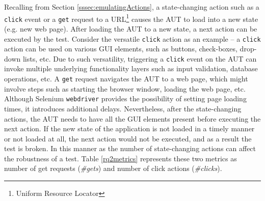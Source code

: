 Recalling from Section \ref{sssec:emulatingActions}, a state-changing action such as a \texttt{click} event or a \texttt{get} request to a URL\footnote{Uniform Resource Locator} causes the AUT to load into a new state (e.g. new web page). After loading the AUT to a new state, a next action can be executed by the test. Consider the versatile \texttt{click} action as an example -- a \texttt{click} action can be used on various GUI elements, such as buttons, check-boxes, drop-down lists, etc. Due to such versatility, triggering a \texttt{click} event on the AUT can invoke multiple underlying functionality layers such as input validation, database operations, etc. A \texttt{get} request navigates the AUT to a web page, which might involve steps such as starting the browser window, loading the web page, etc. Although Selenium \texttt{webdriver} provides the possibility of setting page loading times, it introduces additional delays. Nevertheless, after the state-changing actions, the AUT needs to have all the GUI elements present before executing the next action. If the new state of the application is not loaded in a timely manner or not loaded at all, the next action would not be executed, and as a result the test is broken. In this manner as the number of state-changing actions can affect the robustness of a test. Table \ref{rq2metrics} represents these two metrics as number of get requests (\textit{\#gets}) and number of click actions (\textit{\#clicks}).

